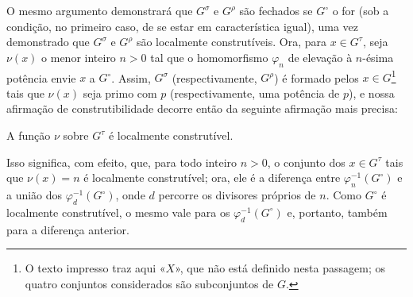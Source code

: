 O mesmo argumento demonstrará que $G^\sigma$ e $G^\rho$ são fechados se
$G^\circ$ o for (sob a condição, no primeiro caso, de se estar em
característica igual), uma vez demonstrado que $G^\sigma$ e $G^\rho$ são
localmente construtíveis. Ora, para $x\in G^\tau$, seja $\nu(x)$ o menor
inteiro $n>0$ tal que o homomorfismo $\varphi_n$ de elevação à $n$-ésima
potência envie $x$ a $G^\circ$. Assim, $G^\sigma$ (respectivamente,
$G^\rho$) é formado pelos $x\in G$\footnote{O texto impresso traz aqui
«$X$», que não está definido nesta passagem; os quatro conjuntos considerados
são subconjuntos de $G$.} tais que $\nu(x)$ seja primo com $p$
(respectivamente, uma potência de $p$), e nossa afirmação de construtibilidade
decorre então da seguinte afirmação mais precisa:

 A função $\nu$ sobre $G^\tau$ é localmente construtível.

Isso significa, com efeito, que, para todo inteiro $n>0$, o conjunto dos
$x\in G^\tau$ tais que $\nu(x)=n$ é localmente construtível; ora, ele é a
diferença entre $\varphi_n^{-1}(G^\circ)$ e a união dos
$\varphi_d^{-1}(G^\circ)$, onde $d$ percorre os divisores próprios de $n$.
Como $G^\circ$ é localmente construtível, o mesmo vale para os
$\varphi_d^{-1}(G^\circ)$ e, portanto, também para a diferença anterior.

